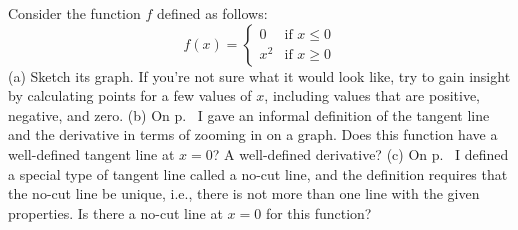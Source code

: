 Consider the function $f$ defined as follows:
\begin{equation*}
  f(x) = \begin{cases}
    0 & \text{if $x\le0$} \\
    x^2 & \text{if $x\ge0$} 
  \end{cases}
\end{equation*}
\hwendpart
(a) Sketch its graph. If you're not sure what it would look like, try to gain
insight by calculating points for a few values of $x$, including values that
are positive, negative, and zero.\hwendpart
(b) On p.~\pageref{tangent-line-informal} I gave an informal definition of the
tangent line and the derivative in terms of zooming in on a graph. Does
this function have a well-defined tangent line at $x=0$? A well-defined
derivative?\hwendpart
(c) On p.~\pageref{no-cut} I defined a special type of tangent line called
a no-cut line, and the definition requires that the no-cut line be unique,
i.e., there is not more than one line with the given properties. Is there a no-cut line at $x=0$
for this function?
